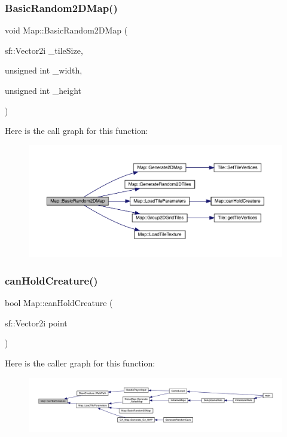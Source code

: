 \subsubsection{\texorpdfstring{Basic\+Random2\+D\+Map()}{BasicRandom2DMap()}}
{\footnotesize\ttfamily void Map\+::\+Basic\+Random2\+D\+Map (\begin{DoxyParamCaption}\item[{sf\+::\+Vector2i}]{\+\_\+tile\+Size,  }\item[{unsigned int}]{\+\_\+width,  }\item[{unsigned int}]{\+\_\+height }\end{DoxyParamCaption})}

Here is the call graph for this function\+:\nopagebreak
\begin{figure}[H]
\begin{center}
\leavevmode
\includegraphics[width=350pt]{dd/d11/class_map_a1fabae1bed7d63177af112101c38c3b5_cgraph}
\end{center}
\end{figure}
\mbox{\label{class_map_a2ee6fd8a412c966c941784b226374bd1}} 
\subsubsection{\texorpdfstring{can\+Hold\+Creature()}{canHoldCreature()}}
{\footnotesize\ttfamily bool Map\+::can\+Hold\+Creature (\begin{DoxyParamCaption}\item[{sf\+::\+Vector2i}]{point }\end{DoxyParamCaption})}

Here is the caller graph for this function\+:
\nopagebreak
\begin{figure}[H]
\begin{center}
\leavevmode
\includegraphics[width=350pt]{dd/d11/class_map_a2ee6fd8a412c966c941784b226374bd1_icgraph}
\end{center}
\end{figure}
\mbox{\label{class_map_ab78fd8c747e184be9b86b993a60ca00b}} 
